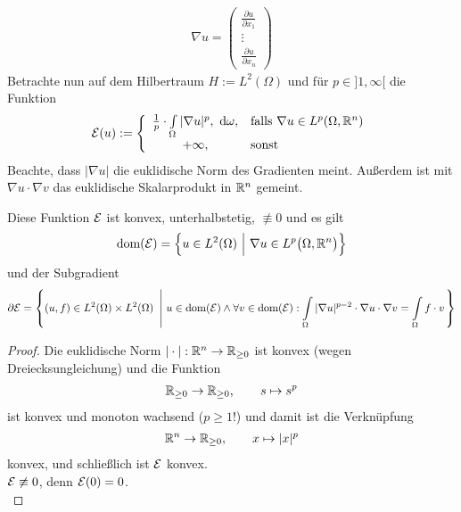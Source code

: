 \begin{beispiel}
\begin{align*}
\nabla u=\begin{pmatrix}
\frac{\partial u}{\partial x_1}\\
\vdots\\
\frac{\partial u}{\partial x_n}
\end{pmatrix}
\end{align*}
Betrachte nun auf dem Hilbertraum $H:=L^2(\Omega)$ und für $p\in]1,\infty[$ die Funktion
\begin{align*}
\mathcal{E}(u):=\left\lbrace\begin{array}{cl}
\frac{1}{p}\cdot\int\limits_\Omega |\nabla u|^p,\text{ d}\omega, &\text{falls } \nabla u\in L^p(\Omega,\mathbb{R}^n)\\
+\infty, &\text{sonst }
\end{array}\right.
\end{align*}
Beachte, dass $|\nabla u|$ die euklidische Norm des Gradienten meint. Außerdem ist mit $\nabla u\cdot\nabla v$ das euklidische Skalarprodukt in $\mathbb{R}^n$ gemeint.

\begin{lemma} %
Diese Funktion $\mathcal{E}$ ist konvex, unterhalbstetig, $\not\equiv0$ und es gilt
\begin{align*}
\text{dom}(\mathcal{E})=\Big\lbrace u\in L^2(\Omega)~\Big|~\nabla u\in L^p\big(\Omega,\mathbb{R}^n\big)\Big\rbrace
\end{align*}
und der Subgradient
\begin{align*}
\partial\mathcal{E}=\left\lbrace(u,f)\in L^2(\Omega)\times L^2(\Omega)~\left|~u\in\text{dom}(\mathcal{E})\wedge\forall v\in\text{dom}(\mathcal{E}):\int\limits_\Omega|\nabla u|^{p-2}\cdot\nabla u\cdot\nabla v=\int\limits_\Omega f\cdot v\right.\right\rbrace
\end{align*}
\end{lemma}
\begin{proof}
Die euklidische Norm $|\cdot|:\mathbb{R}^n\to\mathbb{R}_{\geq0}$ ist konvex (wegen Dreiecksungleichung) und die Funktion
\begin{align*}
\mathbb{R}_{\geq0}\to\mathbb{R}_{\geq0},\qquad s\mapsto s^p
\end{align*}
ist konvex und monoton wachsend ($p\geq1$!) und damit ist die Verknüpfung
\begin{align*}
\mathbb{R}^n\to\mathbb{R}_{\geq0},\qquad x\mapsto |x|^p
\end{align*}
konvex, und schließlich ist $\mathcal{E}$ konvex.\\
$\mathcal{E}\not\equiv0$, denn $\mathcal{E}(0)=0$.\\


\end{proof}
\end{beispiel}
